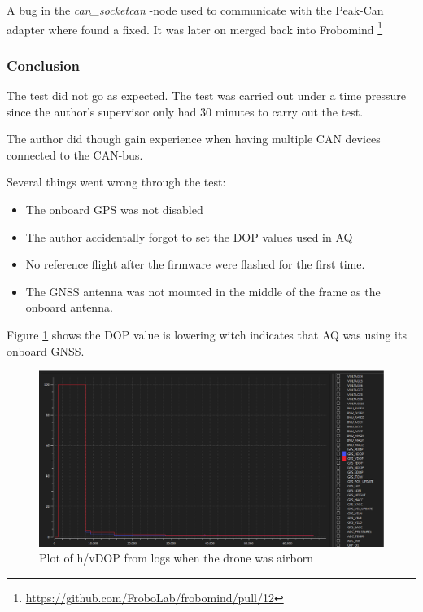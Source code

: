 A bug in the \textit{can\_socketcan} -node used to communicate with the Peak-Can adapter where found a fixed. It was later on merged back into Frobomind \footnote{\url{https://github.com/FroboLab/frobomind/pull/12}}

\subsubsection{Conclusion}
The test did not go as expected. The test was carried out under a time pressure since the author's supervisor only had 30 minutes to carry out the test.

The author did though gain experience when having multiple CAN devices connected to the CAN-bus.

Several things went wrong through the test:
\begin{itemize}
	\item The onboard GPS was not disabled
	\item The author accidentally forgot to set the DOP values used in AQ
	\item No reference flight after the firmware were flashed for the first time.
	\item The GNSS antenna was not mounted in the middle of the frame as the onboard antenna.
\end{itemize}

Figure \ref{fig:qground_station_dop} shows the DOP value is lowering witch indicates that AQ was using its onboard GNSS.

\begin{figure}[H]
    \center
    \includegraphics[width=1\textwidth]{graphics/test_qground_station_dop.eps}
  \caption{Plot of h/vDOP from logs when the drone was airborn}
    \label{fig:qground_station_dop}
\end{figure}